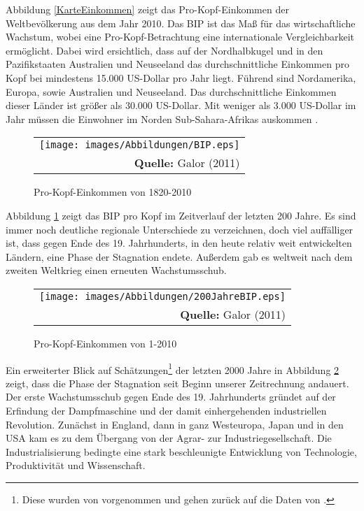 Abbildung \ref{KarteEinkommen} zeigt das Pro-Kopf-Einkommen der Weltbev{\"o}lkerung aus dem Jahr 2010. Das BIP ist das Ma{\ss} für das wirtschaftliche Wachstum, wobei eine Pro-Kopf-Betrachtung eine internationale Vergleichbarkeit ermöglicht. Dabei wird ersichtlich, dass auf der Nordhalbkugel und in den Pazifikstaaten Australien und Neuseeland das durchschnittliche Einkommen pro Kopf bei mindestens 15.000 US-Dollar pro Jahr liegt. F{\"u}hrend sind Nordamerika, Europa, sowie Australien und Neuseeland. Das durchschnittliche Einkommen dieser L{\"a}nder ist gr{\"o}{\ss}er als 30.000 US-Dollar. Mit weniger als 3.000 US-Dollar im Jahr m{\"u}ssen die Einwohner im Norden Sub-Sahara-Afrikas auskommen \citep[Kapitel 1]{Galor.2014}.\newline
		
		\begin{figure}[h!]
			\centering 
				\begin{tabular}{@{}r@{}}  
				\texttt{[image: images/Abbildungen/BIP.eps]}\\
				\footnotesize\sffamily\textbf{Quelle:} Galor (2011) %
				\end{tabular}  
			\caption{Pro-Kopf-Einkommen von 1820-2010} 
			\label{BIP200Jahre}
		\end{figure}
		
Abbildung \ref{BIP200Jahre} zeigt das BIP pro Kopf im Zeitverlauf der letzten 200 Jahre. Es sind immer noch deutliche regionale Unterschiede zu verzeichnen, doch viel auff{\"a}lliger ist, dass gegen Ende des 19. Jahrhunderts, in den heute relativ weit entwickelten L{\"a}ndern, eine Phase der Stagnation endete. Au{\ss}erdem gab es weltweit nach dem zweiten Weltkrieg einen erneuten Wachstumsschub.

		\begin{figure}[h!]
			\centering 
			\begin{tabular}{@{}r@{}} 
				\psfrag{A}{Asien} 
				\texttt{[image: images/Abbildungen/200JahreBIP.eps]}\\
				\footnotesize\sffamily\textbf{Quelle:} Galor (2011) %
			\end{tabular}  
			\caption{Pro-Kopf-Einkommen von 1-2010} 
			\label{BIP2000Jahre}
		\end{figure}
		
Ein erweiterter Blick auf Schätzungen\footnote{Diese wurden von \citet{Galor.2011} vorgenommen und gehen zurück auf die Daten von \citet{Maddison.2001}.} der letzten 2000 Jahre in Abbildung \ref{BIP2000Jahre} zeigt, dass die Phase der Stagnation seit Beginn unserer Zeitrechnung andauert. Der erste Wachstumsschub gegen Ende des 19. Jahrhunderts  gr{\"u}ndet auf der Erfindung der Dampfmaschine und der damit einhergehenden industriellen Revolution. Zun{\"a}chst in England, dann in ganz Westeuropa, Japan und in den USA kam es zu dem {\"U}bergang von der Agrar- zur Industriegesellschaft. Die Industrialisierung bedingte eine stark beschleunigte Entwicklung von Technologie, Produktivit{\"a}t und Wissenschaft.\newline


